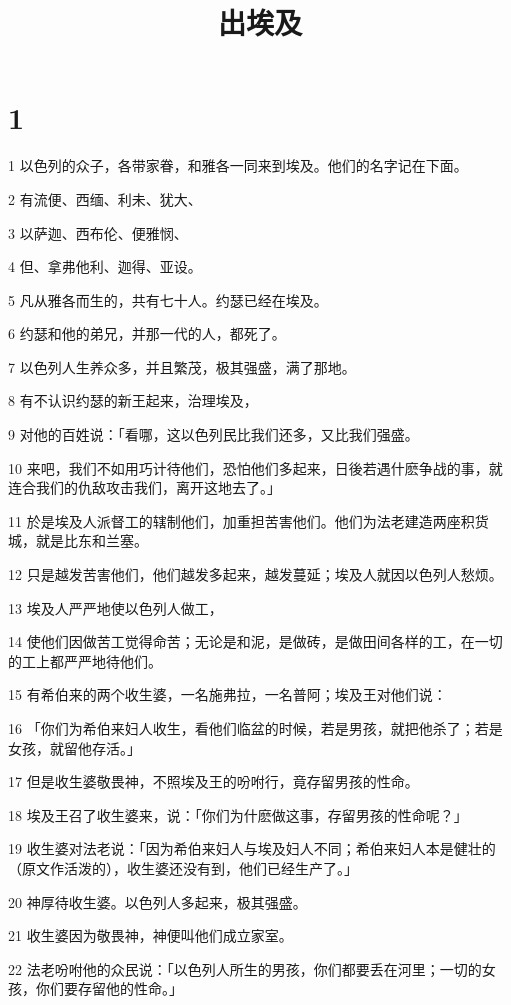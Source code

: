 

\title{出埃及}


\chapter{1}

\par 1 以色列的众子，各带家眷，和雅各一同来到埃及。他们的名字记在下面。
\par 2 有流便、西缅、利未、犹大、
\par 3 以萨迦、西布伦、便雅悯、
\par 4 但、拿弗他利、迦得、亚设。
\par 5 凡从雅各而生的，共有七十人。约瑟已经在埃及。
\par 6 约瑟和他的弟兄，并那一代的人，都死了。
\par 7 以色列人生养众多，并且繁茂，极其强盛，满了那地。
\par 8 有不认识约瑟的新王起来，治理埃及，
\par 9 对他的百姓说：「看哪，这以色列民比我们还多，又比我们强盛。
\par 10 来吧，我们不如用巧计待他们，恐怕他们多起来，日後若遇什麽争战的事，就连合我们的仇敌攻击我们，离开这地去了。」
\par 11 於是埃及人派督工的辖制他们，加重担苦害他们。他们为法老建造两座积货城，就是比东和兰塞。
\par 12 只是越发苦害他们，他们越发多起来，越发蔓延；埃及人就因以色列人愁烦。
\par 13 埃及人严严地使以色列人做工，
\par 14 使他们因做苦工觉得命苦；无论是和泥，是做砖，是做田间各样的工，在一切的工上都严严地待他们。
\par 15 有希伯来的两个收生婆，一名施弗拉，一名普阿；埃及王对他们说：
\par 16 「你们为希伯来妇人收生，看他们临盆的时候，若是男孩，就把他杀了；若是女孩，就留他存活。」
\par 17 但是收生婆敬畏神，不照埃及王的吩咐行，竟存留男孩的性命。
\par 18 埃及王召了收生婆来，说：「你们为什麽做这事，存留男孩的性命呢？」
\par 19 收生婆对法老说：「因为希伯来妇人与埃及妇人不同；希伯来妇人本是健壮的（原文作活泼的），收生婆还没有到，他们已经生产了。」
\par 20 神厚待收生婆。以色列人多起来，极其强盛。
\par 21 收生婆因为敬畏神，神便叫他们成立家室。
\par 22 法老吩咐他的众民说：「以色列人所生的男孩，你们都要丢在河里；一切的女孩，你们要存留他的性命。」

